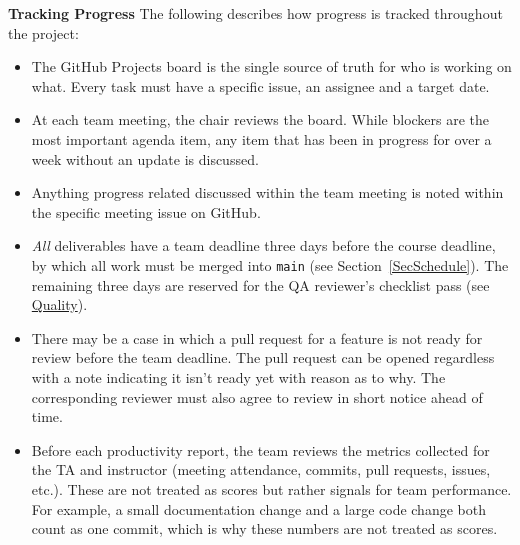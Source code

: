 \documentclass{article}
\begin{document}
\textbf{Tracking Progress} \newline
The following describes how progress is tracked throughout the project:
\begin{itemize}
    \item The GitHub Projects board is the single source of truth for who is working on what. Every task must have a specific issue, an assignee and a target date.
    \item At each team meeting, the chair reviews the board. While blockers are the most important agenda item, any item that has been in progress for over a week without an update is discussed.
    \item Anything progress related discussed within the team meeting is noted within the specific meeting issue on GitHub.
    \item \emph{All} deliverables have a team deadline three days before the course deadline, by which all work must be merged into \texttt{main} (see Section~\ref{SecSchedule}). The remaining three days are reserved for the QA reviewer's checklist pass (see \hyperref[sec:quality]{Quality}).
    \item There may be a case in which a pull request for a feature is not ready for review before the team deadline. The pull request can be opened regardless with a note indicating it isn't ready yet with reason as to why. The corresponding reviewer must also agree to review in short notice ahead of time.
    \item Before each productivity report, the team reviews the metrics collected for the TA and instructor (meeting attendance, commits, pull requests, issues, etc.). These are not treated as scores but rather signals for team performance. For example, a small documentation change and a large code change both count as one commit, which is why these numbers are not treated as scores.
\end{itemize}
\end{document}
